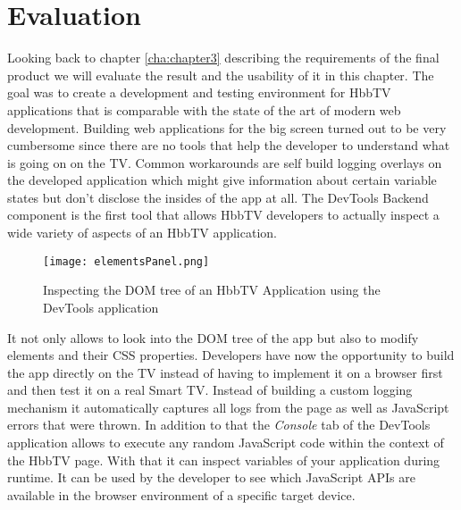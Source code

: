 
\chapter{Evaluation\label{cha:chapter6}}

Looking back to chapter \ref{cha:chapter3} describing the requirements of the final product we will
evaluate the result and the usability of it in this chapter. The goal was to create a development
and testing environment for HbbTV applications that is comparable with the state of the art of
modern web development. Building web applications for the big screen turned out to be very cumbersome
since there are no tools that help the developer to understand what is going on on the TV. Common
workarounds are self build logging overlays on the developed application which might give information
about certain variable states but don't disclose the insides of the app at all. The DevTools Backend
component is the first tool that allows HbbTV developers to actually inspect a wide variety of aspects
of an HbbTV application.

\begin{figure}[htb]
  \centering
  \hspace*{-0.7cm}
  \texttt{[image: elementsPanel.png]}\\
  \caption{Inspecting the DOM tree of an HbbTV Application using the DevTools application}\label{fig:elementsPanel}
\end{figure}

It not only allows to look into the DOM tree of the app but also to modify elements and their CSS
properties. Developers have now the opportunity to build the app directly on the TV instead of
having to implement it on a browser first and then test it on a real Smart TV. Instead of building
a custom logging mechanism it automatically captures all logs from the page as well as JavaScript
errors that were thrown. In addition to that the \textit{Console} tab of the DevTools application
allows to execute any random JavaScript code within the context of the HbbTV page. With that it
can inspect variables of your application during runtime. It can be used by the developer to see
which JavaScript APIs are available in the browser environment of a specific target device.


